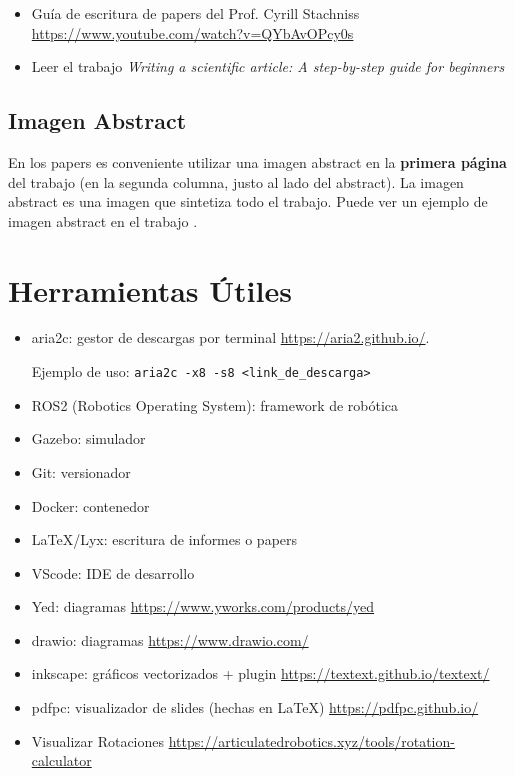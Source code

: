 \documentclass[a4paper,	11pt]{article}
\begin{document}
\begin{itemize}
    \item Guía de escritura de papers del Prof. Cyrill Stachniss \url{https://www.youtube.com/watch?v=QYbAvOPcy0s}
    \item Leer el trabajo \emph{Writing a scientific article: A step-by-step guide for beginners} \cite{ecarnot2015writing}
\end{itemize}


\subsection{Imagen Abstract}
En los papers es conveniente utilizar una imagen abstract en la \textbf{primera página} del trabajo (en la segunda columna, justo al lado del abstract). La imagen abstract es una imagen que sintetiza todo el trabajo. Puede ver un ejemplo de imagen abstract en el trabajo \cite{sarlin2020superglue}.


\section{Herramientas Útiles}

\begin{itemize}
    \item aria2c: gestor de descargas por terminal \url{https://aria2.github.io/}.
    
    Ejemplo de uso: \lstinline{aria2c -x8 -s8 <link_de_descarga>}
    \item ROS2 (Robotics Operating System): framework de robótica
    \item Gazebo: simulador
    \item Git: versionador
    \item Docker: contenedor
    \item {\LaTeX}/Lyx: escritura de informes o papers
    \item VScode: IDE de desarrollo
    \item Yed: diagramas \url{https://www.yworks.com/products/yed}
    \item drawio: diagramas \url{https://www.drawio.com/}
    \item inkscape: gráficos vectorizados + plugin \url{https://textext.github.io/textext/}
    \item pdfpc: visualizador de slides (hechas en {\LaTeX}) \url{https://pdfpc.github.io/}
    \item Visualizar Rotaciones \url{https://articulatedrobotics.xyz/tools/rotation-calculator}
\end{itemize}


\printbibliography
\end{document}
